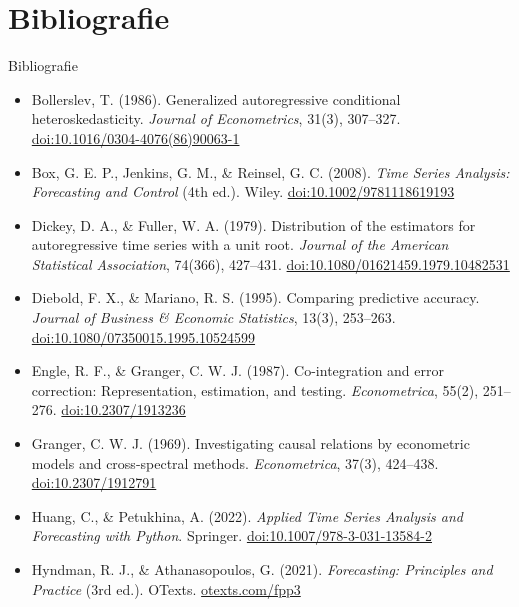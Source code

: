 \section{Bibliografie}

\begin{frame}{Bibliografie}
\itemsize{\tiny}
\begin{itemize}
    \item Bollerslev, T. (1986). Generalized autoregressive conditional heteroskedasticity. \textit{Journal of Econometrics}, 31(3), 307--327. \href{https://doi.org/10.1016/0304-4076(86)90063-1}{doi:10.1016/0304-4076(86)90063-1}
    \item Box, G. E. P., Jenkins, G. M., \& Reinsel, G. C. (2008). \textit{Time Series Analysis: Forecasting and Control} (4th ed.). Wiley. \href{https://doi.org/10.1002/9781118619193}{doi:10.1002/9781118619193}
    \item Dickey, D. A., \& Fuller, W. A. (1979). Distribution of the estimators for autoregressive time series with a unit root. \textit{Journal of the American Statistical Association}, 74(366), 427--431. \href{https://doi.org/10.1080/01621459.1979.10482531}{doi:10.1080/01621459.1979.10482531}
    \item Diebold, F. X., \& Mariano, R. S. (1995). Comparing predictive accuracy. \textit{Journal of Business \& Economic Statistics}, 13(3), 253--263. \href{https://doi.org/10.1080/07350015.1995.10524599}{doi:10.1080/07350015.1995.10524599}
    \item Engle, R. F., \& Granger, C. W. J. (1987). Co-integration and error correction: Representation, estimation, and testing. \textit{Econometrica}, 55(2), 251--276. \href{https://doi.org/10.2307/1913236}{doi:10.2307/1913236}
    \item Granger, C. W. J. (1969). Investigating causal relations by econometric models and cross-spectral methods. \textit{Econometrica}, 37(3), 424--438. \href{https://doi.org/10.2307/1912791}{doi:10.2307/1912791}
    \item Huang, C., \& Petukhina, A. (2022). \textit{Applied Time Series Analysis and Forecasting with Python}. Springer. \href{https://doi.org/10.1007/978-3-031-13584-2}{doi:10.1007/978-3-031-13584-2}
    \item Hyndman, R. J., \& Athanasopoulos, G. (2021). \textit{Forecasting: Principles and Practice} (3rd ed.). OTexts. \href{https://otexts.com/fpp3/}{otexts.com/fpp3}

\end{itemize}
\end{frame}
